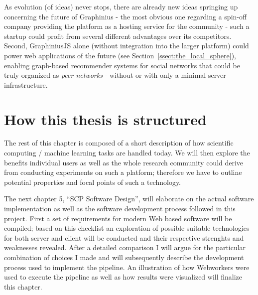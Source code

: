 As evolution (of ideas) never stops, there are already new ideas springing up concerning the future of Graphinius - the most obvious one regarding a spin-off company providing the platform as a hosting service for the community - such a startup could profit from several different advantages over its competitors. Second, GraphiniusJS alone (without integration into the larger platform) could power web applications of the future (see Section~\ref{ssect:the_local_sphere}), enabling graph-based recommender systems for social networks that could be truly organized as \textit{peer networks} - without or with only a minimal server infrastructure.


\section{How this thesis is structured}
\label{section:thesis_structure}

The rest of this chapter is composed of a short description of how scientific computing / machine learning tasks are handled today. We will then explore the benefits individual users as well as the whole research community could derive from conducting experiments on such a platform; therefore we have to outline potential properties and focal points of such a technology.





The next chapter 5, ``SCP Software Design'', will elaborate on the actual software implementation as well as the software development process followed in this project. First a set of requirements for modern Web based software will be compiled; based on this checklist an exploration of possible suitable technologies for both server and client will be conducted and their respective strenghts and weaknesses revealed. After a detailed comparison I will argue for the particular combination of choices I made and will subsequently describe the development process used to implement the pipeline. An illustration of how Webworkers were used to execute the pipeline as well as how results were visualized will finalize this chapter.


